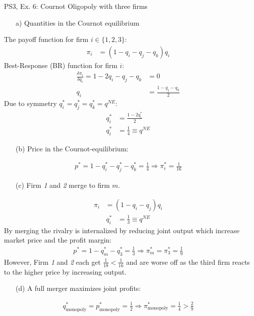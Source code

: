 \begin{frame}{PS3, Ex. 6: Cournot Oligopoly with three firms}
  \begin{multicols}{2}
    \begin{itemize}
      \item[a)] Quantities in the Cournot equilibrium
    \end{itemize}
    The payoff function for firm $i\in\{1,2,3\}$:
    \begin{align*}
        \pi_i&=(1-q_i-q_j-q_k)q_i
    \end{align*}
    Best-Response (BR) function for firm $i$:
    \begin{align*}
        \frac{\delta\pi_i}{\delta q_i}=1-2q_i-q_j-q_k&=0\\
                                                  q_i&=\frac{1-q_j-q_k}{2}
    \end{align*}
    Due to symmetry $q_i^{*}=q_j^{*}=q_k^{*}=q^{NE}$:
    \begin{align*}
        q_i^{*} &= \frac{1-2q_i^{*}}{2}\\
        q_i^{*} &= \frac{1}{4}\equiv q^{NE}
    \end{align*}
    \begin{itemize}
      \item[(b)] Price in the Cournot-equilibrium:
    \end{itemize}
    \begin{align*}
      p^{*}=1-q_i^{*}-q_j^{*}-q_k^{*}=\frac{1}{4}\Rightarrow\pi_i^{*}=\frac{1}{16}
    \end{align*}
  \vfill\null \columnbreak
    \begin{itemize}
      \item[(c)] Firm \textit{1} and \textit{2} merge to firm $m$.
    \end{itemize}
    \begin{align*}
        \pi_i&=(1-q_i-q_j)q_i
    \end{align*}
    \begin{align*}
        q_i^{*} &= \frac{1}{3}\equiv q^{NE}
    \end{align*}
    By merging the rivalry is internalized by reducing joint output which increase market price and the profit margin:
    \begin{align*}
      p^{*}=1-q_m^{*}-q_3^{*}=\frac{1}{3}\Rightarrow\pi_m^{*}=\pi_3^{*}=\frac{1}{9}
    \end{align*}
    However, Firm \textit{1} and \textit{2} each get $\frac{1}{18}<\frac{1}{16}$ and are worse off as the third firm reacts to the higher price by increasing output.
    \begin{itemize}
      \item[(d)] A full merger maximizes joint profits:
    \end{itemize}
    \begin{align*}
      q_\text{monopoly}^{*}=p_\text{monopoly}^{*}=\frac{1}{2}\Rightarrow \pi_\text{monopoly}^{*}=\frac{1}{4}>\frac{2}{9}
    \end{align*}
  \vfill\null
  \end{multicols}
\end{frame}



